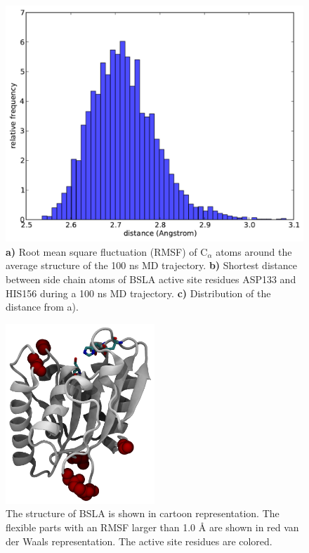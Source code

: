 \documentclass[english, a4paper, 12pt, titlepage, draft]{article}
\begin{document}
\begin{figure}
\begin{minipage}[]{0.45\linewidth}
        \includegraphics[width=\textwidth]{figures/BSLA_solo/BSLA_distribution_ASP133_HIS156.pdf}  
    \end{minipage}
    \caption{
    \textbf{a)} Root mean square fluctuation (RMSF) of C$_\alpha$ atoms around the average structure of the 100 ns MD trajectory.
    \textbf{b)} Shortest distance between side chain atoms of BSLA active site residues ASP133 and HIS156 during a 100 ns MD trajectory. 
    \textbf{c)} Distribution of the distance from a).}
\label{fig:BSLA_solo}
\end{figure} 


\begin{figure}
    \centering
    \includegraphics[width=0.5\textwidth]{figures/BSLA_flexibility.png}
    \caption{The structure of BSLA is shown in cartoon representation. The flexible parts with an RMSF larger than 1.0 \r{A} are shown in red van der Waals representation. The active site residues are colored.}
    \label{fig:BSLA_flexibility}
\end{figure}       
 
\end{document}
